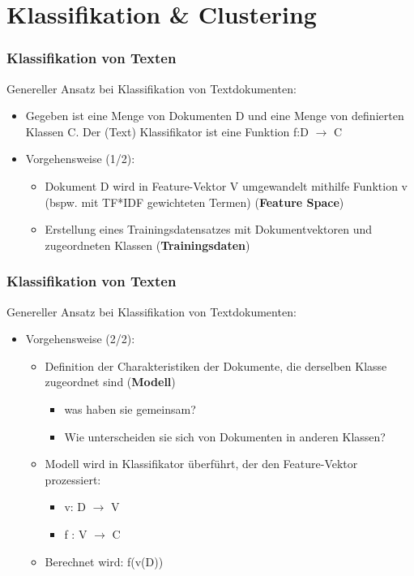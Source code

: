 
\section{Klassifikation \& Clustering}


\begin{frame}
    \frametitle{Klassifikation von Texten}

    Genereller Ansatz bei Klassifikation von Textdokumenten:
    \begin{itemize}
    \item Gegeben ist eine Menge von Dokumenten D und eine Menge von definierten Klassen C. Der (Text) Klassifikator ist eine Funktion f:D $\rightarrow$ C
    \item Vorgehensweise (1/2):
    \begin{itemize}
    \item Dokument D wird in Feature-Vektor V umgewandelt mithilfe Funktion v (bspw. mit TF*IDF gewichteten Termen) (\textbf{Feature Space})
    \item Erstellung eines Trainingsdatensatzes mit Dokumentvektoren und zugeordneten Klassen (\textbf{Trainingsdaten})
    \end{itemize}
    \end{itemize}
\end{frame}
    

\begin{frame}
    \frametitle{Klassifikation von Texten}

    Genereller Ansatz bei Klassifikation von Textdokumenten:
    \begin{itemize}
    \item Vorgehensweise (2/2):
    \begin{itemize}
    \item Definition der Charakteristiken der Dokumente, die derselben Klasse zugeordnet sind (\textbf{Modell})
    \begin{itemize}
    \item was haben sie gemeinsam?
    \item Wie unterscheiden sie sich von Dokumenten in anderen Klassen?
    \end{itemize}
    \item Modell wird in Klassifikator überführt, der den Feature-Vektor prozessiert:
    \begin{itemize}
    \item v: D $\rightarrow$ V
    \item f : V $\rightarrow$ C
    \end{itemize}
    \item Berechnet wird: f(v(D))
    \end{itemize}
    \end{itemize}
\end{frame}
    
